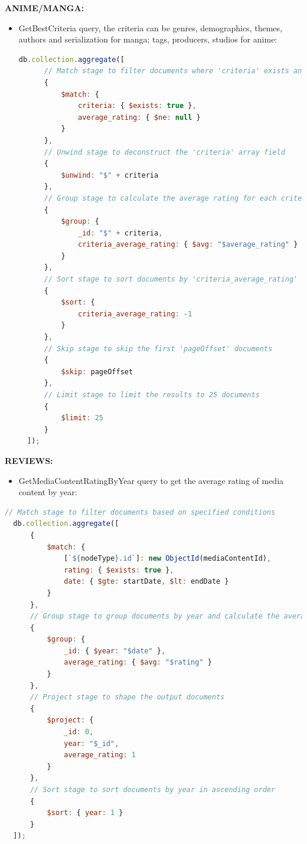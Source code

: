 \textbf{ANIME/MANGA:}

\begin{itemize}

\item GetBestCriteria query, the criteria can be genres, demographics, themes, authors and serialization for manga; tags, producers, studios for anime:
\begin{lstlisting}[language=JavaScript, caption=GetBestCriteria]
  db.collection.aggregate([
      // Match stage to filter documents where 'criteria' exists and 'average_rating' is not null
      {
          $match: {
              criteria: { $exists: true },
              average_rating: { $ne: null }
          }
      },
      // Unwind stage to deconstruct the 'criteria' array field
      {
          $unwind: "$" + criteria
      },
      // Group stage to calculate the average rating for each criteria
      {
          $group: {
              _id: "$" + criteria,
              criteria_average_rating: { $avg: "$average_rating" }
          }
      },
      // Sort stage to sort documents by 'criteria_average_rating' in descending order
      {
          $sort: {
              criteria_average_rating: -1
          }
      },
      // Skip stage to skip the first 'pageOffset' documents
      {
          $skip: pageOffset
      },
      // Limit stage to limit the results to 25 documents
      {
          $limit: 25
      }
  ]);
  \end{lstlisting}

\end{itemize}

\textbf{REVIEWS:}

\begin{itemize}
\item GetMediaContentRatingByYear query to get the average rating of media content by year:
\end{itemize}


\begin{lstlisting}[language=JavaScript, caption=GetMediaContentRatingByYear]
  // Match stage to filter documents based on specified conditions
  db.collection.aggregate([
      {
          $match: {
              [`${nodeType}.id`]: new ObjectId(mediaContentId),
              rating: { $exists: true },
              date: { $gte: startDate, $lt: endDate }
          }
      },
      // Group stage to group documents by year and calculate the average rating
      {
          $group: {
              _id: { $year: "$date" },
              average_rating: { $avg: "$rating" }
          }
      },
      // Project stage to shape the output documents
      {
          $project: {
              _id: 0,
              year: "$_id",
              average_rating: 1
          }
      },
      // Sort stage to sort documents by year in ascending order
      {
          $sort: { year: 1 }
      }
  ]);
  \end{lstlisting}


